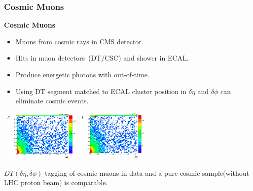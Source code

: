 \documentclass{beamer}
\begin{document}
\begin{frame}
\frametitle{Cosmic Muons}
\small{
 \begin{varblock}[7cm]{\textbf{Cosmic Muons}}
 \begin{itemize}
  \item Muons from cosmic rays in CMS detector.
  \item Hits in muon detectors~(DT/CSC) and shower in ECAL.
  \item Produce energetic photons with out-of-time.
  \item Using DT segment matched to ECAL cluster position in $\delta \eta$ and $\delta \phi$ can eliminate cosmic events.
 \end{itemize}
 \end{varblock}
 }
 \vspace{-0.2cm}
 \begin{tcolorbox}[colback=UNL@Cream!5,colframe=UMN@Maroon!40,title=\textcolor{UMN@Maroon}{$DT(\delta \eta, \delta \phi)$\textbf{Cosmic Muon dataset(left) and Data(Right)}}]
 \mbox{ 
 \includegraphics[height=2.50cm,width=0.3\paperwidth]{THESISPLOTS/Cosmic_Ray_Photons_Cosmic_dataset.png} \quad \quad
 \includegraphics[height=2.50cm,width=0.3\paperwidth]{THESISPLOTS/cosmics_dPhidEta.png}
 } 
 \end{tcolorbox}
 \vspace{-0.2cm}
 $DT(\delta \eta, \delta \phi)$ tagging of cosmic muons in data and a pure cosmic sample(without LHC proton beam) is comparable.
 
 
\end{frame}
\end{document}
